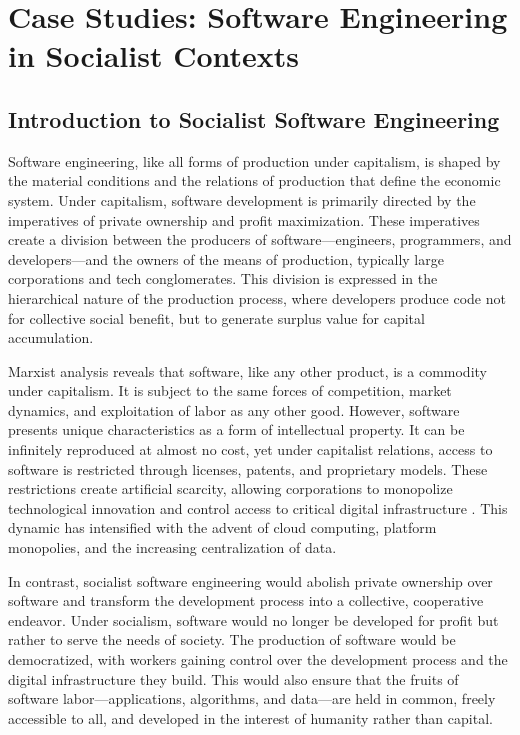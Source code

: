 \chapter{Case Studies: Software Engineering in Socialist Contexts}
\begin{refsection}

\section{Introduction to Socialist Software Engineering}

Software engineering, like all forms of production under capitalism, is shaped by the material conditions and the relations of production that define the economic system. Under capitalism, software development is primarily directed by the imperatives of private ownership and profit maximization. These imperatives create a division between the producers of software—engineers, programmers, and developers—and the owners of the means of production, typically large corporations and tech conglomerates. This division is expressed in the hierarchical nature of the production process, where developers produce code not for collective social benefit, but to generate surplus value for capital accumulation.

Marxist analysis reveals that software, like any other product, is a commodity under capitalism. It is subject to the same forces of competition, market dynamics, and exploitation of labor as any other good. However, software presents unique characteristics as a form of intellectual property. It can be infinitely reproduced at almost no cost, yet under capitalist relations, access to software is restricted through licenses, patents, and proprietary models. These restrictions create artificial scarcity, allowing corporations to monopolize technological innovation and control access to critical digital infrastructure \cite[pp.~243-244]{marx}. This dynamic has intensified with the advent of cloud computing, platform monopolies, and the increasing centralization of data.

In contrast, socialist software engineering would abolish private ownership over software and transform the development process into a collective, cooperative endeavor. Under socialism, software would no longer be developed for profit but rather to serve the needs of society. The production of software would be democratized, with workers gaining control over the development process and the digital infrastructure they build. This would also ensure that the fruits of software labor—applications, algorithms, and data—are held in common, freely accessible to all, and developed in the interest of humanity rather than capital.


\end{refsection}

